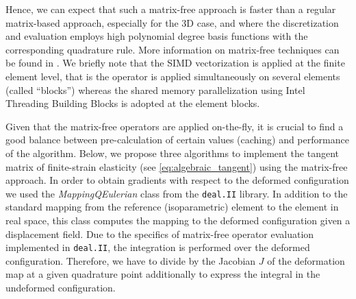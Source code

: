 \documentclass[preprint,12pt,times]{elsarticle}
\begin{document}
Hence, we can expect that such a matrix-free approach is faster than a regular matrix-based approach, especially for the 3D case, and where the discretization and evaluation employs high polynomial degree basis functions with the corresponding quadrature rule.
More information on matrix-free techniques can be found in \cite{kronbichler12,vos10}.
We briefly note that the SIMD vectorization is applied at the finite element level, that is the operator is applied simultaneously on several elements (called ``blocks'') whereas the shared memory parallelization using Intel Threading Building Blocks is adopted at the element blocks.

Given that the matrix-free operators are applied on-the-fly, it is crucial to find a good balance between pre-calculation of certain values (caching) and performance of the algorithm.
Below, we propose three algorithms to implement the tangent matrix of finite-strain elasticity (see \eqref{eq:algebraic_tangent}) using the matrix-free approach.
%
In order to obtain gradients with respect to the deformed configuration we used the \textit{MappingQEulerian} class from the \texttt{deal.II} \cite{dealII90} library.
In addition to the standard mapping from the reference (isoparametric) element to the element in real space, this class computes the mapping to the deformed configuration given a displacement field.
%
Due to the specifics of matrix-free operator evaluation implemented in \texttt{deal.II}, the integration is performed over the deformed configuration. Therefore, we have to divide by the Jacobian $J$ of the deformation map at a given quadrature point additionally to express the integral in the undeformed configuration.
\end{document}
